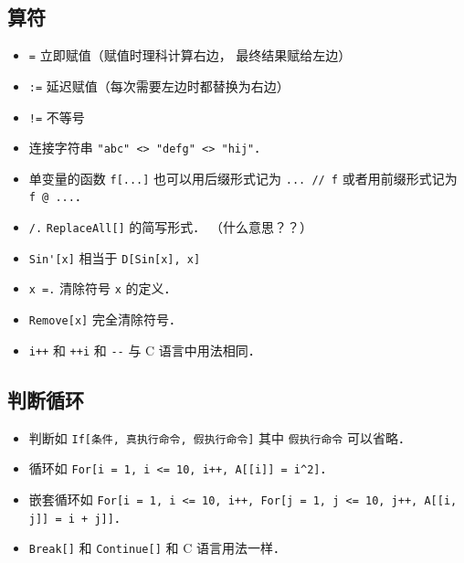 \subsection{算符}
\begin{itemize}
\item \verb|=| 立即赋值（赋值时理科计算右边， 最终结果赋给左边）
\item \verb|:=| 延迟赋值（每次需要左边时都替换为右边）
\item \verb|!=| 不等号
\item 连接字符串 \verb|"abc" <> "defg" <> "hij"|．
\item 单变量的函数 \verb|f[...]| 也可以用后缀形式记为 \verb|... // f| 或者用前缀形式记为 \verb|f @ ...|．
\item \verb|/.| \verb|ReplaceAll[]| 的简写形式． （什么意思？？）
\item \verb|Sin'[x]| 相当于 \verb|D[Sin[x], x]|
\item \verb|x =.| 清除符号 \verb|x| 的定义．
\item \verb|Remove[x]| 完全清除符号．
\item \verb|i++| 和 \verb|++i| 和 \verb|--| 与 C 语言中用法相同．
\end{itemize}

\subsection{判断循环}
\begin{itemize}
\item 判断如 \verb|If[条件, 真执行命令, 假执行命令]| 其中 \verb|假执行命令| 可以省略．
\item 循环如 \verb|For[i = 1, i <= 10, i++, A[[i]] = i^2]|．
\item 嵌套循环如 \verb|For[i = 1, i <= 10, i++, For[j = 1, j <= 10, j++, A[[i, j]] = i + j]]|．
\item \verb|Break[]| 和 \verb|Continue[]| 和 C 语言用法一样．
\end{itemize}


